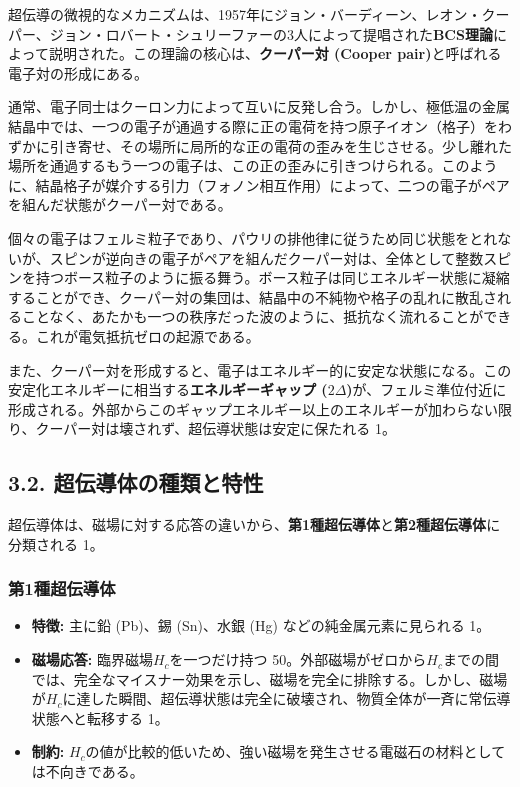 \documentclass[11pt,a4paper]{ltjsarticle}
\begin{document}
超伝導の微視的なメカニズムは、1957年にジョン・バーディーン、レオン・クーパー、ジョン・ロバート・シュリーファーの3人によって提唱された\textbf{BCS理論}によって説明された。この理論の核心は、\textbf{クーパー対 (Cooper pair)}と呼ばれる電子対の形成にある。

通常、電子同士はクーロン力によって互いに反発し合う。しかし、極低温の金属結晶中では、一つの電子が通過する際に正の電荷を持つ原子イオン（格子）をわずかに引き寄せ、その場所に局所的な正の電荷の歪みを生じさせる。少し離れた場所を通過するもう一つの電子は、この正の歪みに引きつけられる。このように、結晶格子が媒介する引力（フォノン相互作用）によって、二つの電子がペアを組んだ状態がクーパー対である。

個々の電子はフェルミ粒子であり、パウリの排他律に従うため同じ状態をとれないが、スピンが逆向きの電子がペアを組んだクーパー対は、全体として整数スピンを持つボース粒子のように振る舞う。ボース粒子は同じエネルギー状態に凝縮することができ、クーパー対の集団は、結晶中の不純物や格子の乱れに散乱されることなく、あたかも一つの秩序だった波のように、抵抗なく流れることができる。これが電気抵抗ゼロの起源である。

また、クーパー対を形成すると、電子はエネルギー的に安定な状態になる。この安定化エネルギーに相当する\textbf{エネルギーギャップ ($2\Delta$)}が、フェルミ準位付近に形成される。外部からこのギャップエネルギー以上のエネルギーが加わらない限り、クーパー対は壊されず、超伝導状態は安定に保たれる 1。

\subsection*{3.2. 超伝導体の種類と特性}

超伝導体は、磁場に対する応答の違いから、\textbf{第1種超伝導体}と\textbf{第2種超伝導体}に分類される 1。

\subsubsection*{第1種超伝導体}

\begin{itemize}
\item \textbf{特徴:} 主に鉛 (Pb)、錫 (Sn)、水銀 (Hg) などの純金属元素に見られる 1。
\item \textbf{磁場応答:} 臨界磁場$H_c$を一つだけ持つ 50。外部磁場がゼロから$H_c$までの間では、完全なマイスナー効果を示し、磁場を完全に排除する。しかし、磁場が$H_c$に達した瞬間、超伝導状態は完全に破壊され、物質全体が一斉に常伝導状態へと転移する 1。
\item \textbf{制約:} $H_c$の値が比較的低いため、強い磁場を発生させる電磁石の材料としては不向きである。
\end{itemize}
\end{document}

